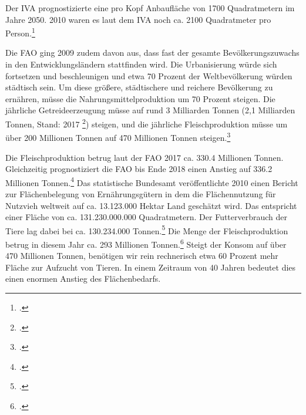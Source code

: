 \documentclass{scrartcl}
\begin{document}
Der IVA prognostizierte eine pro Kopf Anbaufläche von 1700 Quadratmetern im Jahre 2050. 2010 waren es laut dem IVA noch ca. 2100 Quadratmeter pro Person.\footcite[Vgl.]{Agrar0NahrungsmittelLandwirtschaft}

Die FAO ging 2009 zudem davon aus, dass fast der gesamte Bevölkerungszuwachs in den Entwicklungsländern stattfinden wird. Die Urbanisierung würde sich fortsetzen und beschleunigen und etwa 70 Prozent der Weltbevölkerung würden städtisch sein. Um diese größere, städtischere und reichere Bevölkerung zu ernähren, müsse die Nahrungsmittelproduktion um 70 Prozent steigen. Die jährliche Getreideerzeugung müsse auf rund 3 Milliarden Tonnen (2,1 Milliarden Tonnen, Stand: 2017 \footcite[Vgl.]{IGC}) steigen, und die jährliche Fleischproduktion müsse um über 200 Millionen Tonnen auf 470 Millionen Tonnen steigen.\footcite[Vgl.][S. 2]{FAO2009How2050}

Die Fleischproduktion betrug laut der FAO 2017 ca. 330.4 Millionen Tonnen. Gleichzeitig prognostiziert die FAO bis Ende 2018 einen Anstieg auf 336.2 Millionen Tonnen.\footcite[Vgl.][S. 7]{} Das statistische Bundesamt veröffentlichte 2010 einen Bericht zur Flächenbelegung von Ernährungsgütern in dem die Flächennutzung für Nutzvieh weltweit auf ca. 13.123.000 Hektar Land geschätzt wird. Das entspricht einer Fläche von ca. 131.230.000.000 Quadratmetern. Der Futterverbrauch der Tiere lag dabei bei ca. 130.234.000 Tonnen.\footcite[Vgl.][S. 9]{Sttistisches Bundesamt} Die Menge der Fleischproduktion betrug in diesem Jahr ca. 293 Millionen Tonnen.\footcite[Vgl.]{Institute for agricultere & trade Policy} Steigt der Konsom auf über 470 Millionen Tonnen, benötigen wir rein rechnerisch etwa 60 Prozent mehr Fläche zur Aufzucht von Tieren. In einem Zeitraum von 40 Jahren bedeutet dies einen enormen Anstieg des Flächenbedarfs.
\end{document}
